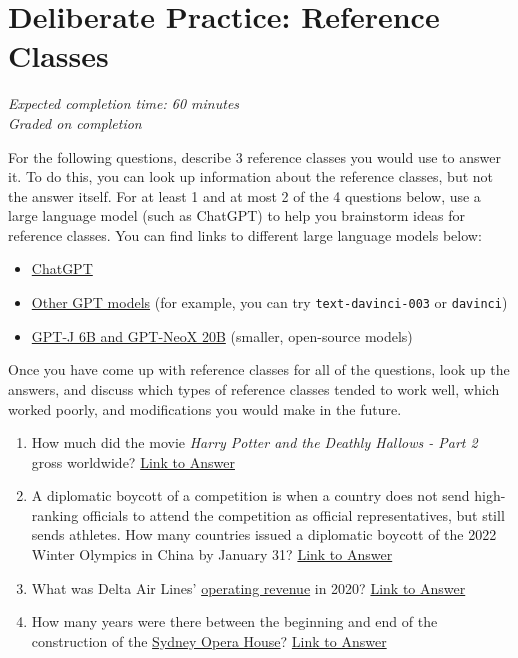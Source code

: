 \documentclass[11pt]{article}
\begin{document}
\section*{Deliberate Practice: Reference Classes}

\emph{Expected completion time: 60 minutes} \\
\emph{Graded on completion}

For the following questions, describe 3 reference classes you would use to answer it. To do this, you can look up information about the reference classes, but not the answer itself. For at least 1 and at most 2 of the 4 questions below, use a large language model (such as ChatGPT) to help you brainstorm ideas for reference classes. You can find links to different large language models below: 
\begin{itemize}
	\item \href{https://chat.openai.com/}{ChatGPT}
	\item \href{https://platform.openai.com/playground}{Other GPT models} (for example, you can try \texttt{text-davinci-003} or \texttt{davinci})
	\item \href{https://textsynth.com/playground.html}{GPT-J 6B and GPT-NeoX 20B} (smaller, open-source models)
\end{itemize}

Once you have come up with reference classes for all of the questions, look up the answers, and discuss which types of reference classes tended to work well, which worked poorly, and modifications you would make in the future. 

\begin{enumerate}
	\item How much did the movie \emph{Harry Potter and the Deathly Hallows - Part 2} gross worldwide? \href{https://en.wikipedia.org/wiki/Harry_Potter_and_the_Deathly_Hallows_%E2%80%93_Part_2#Box_office}{Link to Answer}
	\item A diplomatic boycott of a competition is when a country does not send high-ranking officials to attend the competition as official representatives, but still sends athletes. How many countries issued a diplomatic boycott of the 2022 Winter Olympics in China by January 31? \href{https://en.wikipedia.org/wiki/2022_Winter_Olympics#Diplomatic_boycotts}{Link to Answer}
	\item What was Delta Air Lines' \href{https://www.investopedia.com/terms/o/operating-revenue.asp}{operating revenue} in 2020? \href{https://ir.delta.com/news/news-details/2021/Delta-Air-Lines-Announces-December-Quarter-and-Full-Year-2020-Financial-Results/default.aspx}{Link to Answer}
	\item How many years were there between the beginning and end of the construction of the \href{https://en.wikipedia.org/wiki/Sydney_Opera_House#/media/File:Sydney_Australia._(21339175489).jpg}{Sydney Opera House}? \href{https://en.wikipedia.org/wiki/Sydney_Opera_House}{Link to Answer}
	
\end{enumerate}
\end{document}
